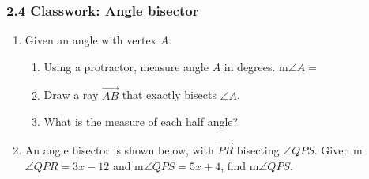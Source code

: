 

\fancyhead[LE]{\thepage}



\subsubsection*{2.4 Classwork: Angle bisector}
\begin{enumerate}
\item Given an angle with vertex $A$.
  \begin{enumerate}[itemsep=0.5cm]
    \item Using a protractor, measure angle $A$ in degrees. m$\angle A =$
    \item Draw a ray $\overrightarrow{AB}$ that exactly bisects $\angle A$.
    \item What is the measure of each half angle?
  \end{enumerate}
  \begin{center}
  \end{center}

\item An angle bisector is shown below, with $\overrightarrow{PR}$ bisecting $\angle QPS$. Given m$\angle QPR = 3x-12$ and m$\angle QPS = 5x+4$, find m$\angle QPS$.
  \begin{flushright}
  \end{flushright}


\end{enumerate}
